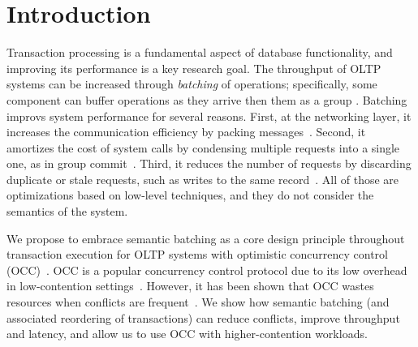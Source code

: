 \section{Introduction}\label{sec:intro}

Transaction processing is a fundamental aspect of database functionality, and improving its performance is a key research goal. The throughput of OLTP systems can be increased through \emph{batching} of operations; specifically, some component can buffer operations as they arrive then  them as a group \cite{friedman1997packing,debrabant2013anti,hagmann1987reimplementing}.
Batching improvs system performance for several reasons. First, at the networking layer, it increases the communication efficiency by packing messages~\cite{ding2015centiman,friedman1997packing}. Second, it amortizes the cost of system calls by condensing multiple requests into a single one, as in group commit~\cite{debrabant2013anti,hagmann1987reimplementing}. Third, it reduces the number of requests by discarding duplicate or stale requests, such as writes to the same record~\cite{faleiro2014lazy}. All of those are optimizations based on low-level techniques, and they do not consider the semantics of the system.

We propose to embrace semantic batching as a core design principle throughout transaction execution for OLTP systems with optimistic concurrency control (OCC)~\cite{kung81tods}.
OCC is a popular concurrency control protocol due to its low overhead in low-contention
settings~\cite{adya97podc, baker11cidr, bernstein2015optimizing,bernstein11cidr,
bernstein11vldb, corbett12osdi,warp, patterson12vldb,peng10osdi,larson2011high}. However, it has been shown that OCC
wastes resources when conflicts are frequent~\cite{agrawal1987concurrency}. We
show how semantic batching (and associated reordering of transactions) can reduce conflicts, improve throughput and latency, and allow us to use OCC with higher-contention workloads.


